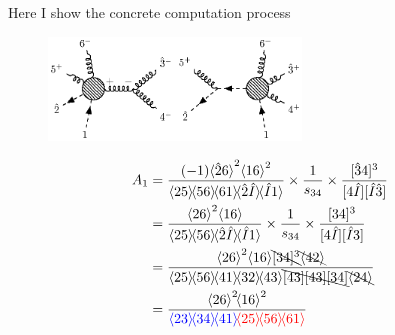 \documentclass{beamer}
\newcommand{\avg}[1]{\langle #1 \rangle}
\newcommand{\mdavg}[2]{\langle #1 \rangle\!\langle #2 \rangle}
\newcommand{\asqu}[1]{{\langle#1\rangle}^2}
\begin{document}
\begin{frame}
    Here I show the concrete computation process 
    \begin{figure}
        \centering
        \includegraphics[width=0.6\textwidth]{6pt.eps}
    \end{figure}
    \vspace{-1em}
    \begin{align*}
    A_1&=\frac{(-1)\asqu{\hat{2}6}\asqu{16}}{\mdavg{25}{56}\!\avg{61}\!\mdavg{\hat{2}\hat{I}}{\hat{I}1}}\times\frac{1}{s_{34}}\times\frac{[\hat{3}4]^3}{[4\hat{I}][\hat{I}\hat{3}]}\notag\\
    &=\frac{\asqu{26}\avg{16}}{\mdavg{25}{56}\!\mdavg{\hat{2}\hat{I}}{\hat{I}1}}\times\frac{1}{s_{34}}\times\frac{[34]^3}{[4\hat{I}][\hat{I}3]}\notag\\
    &=\frac{\asqu{26}\avg{16}\bcancel{[34]^3}\bcancel{\avg{42}}}{\mdavg{25}{56}\!\mdavg{41}{32}\!\avg{43}\bcancel{[43][43][34]}\bcancel{\avg{24}}}\notag\\
    &=\frac{\asqu{26}\!\asqu{16}}{\textcolor{blue}{\mdavg{23}{34}\!\avg{41}}\!\textcolor{red}{\mdavg{25}{56}\!\avg{61}}}
    \end{align*}
\end{frame}
\end{document}
